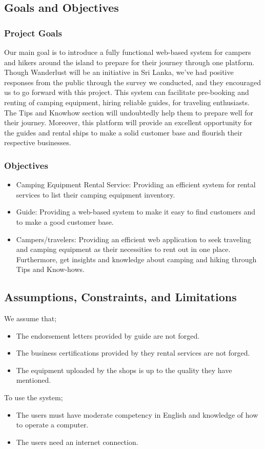 \subsection{Goals and Objectives}
\subsubsection{Project Goals}
Our main goal is to introduce a fully functional web-based system for campers and hikers around the island to prepare for their journey through one platform. Though Wanderlust will be an initiative in Sri Lanka, we’ve had positive responses from the public through the survey we conducted, and they encouraged us to go forward with this project. This system can facilitate pre-booking and renting of camping equipment, hiring reliable guides, for traveling enthusiasts. The Tips and Knowhow section will undoubtedly help them to prepare well for their journey. Moreover, this platform will provide an excellent opportunity for the guides and rental ships to make a solid customer base and flourish their respective businesses.

\subsubsection{Objectives}
\begin{itemize}
	\item Camping Equipment Rental Service: Providing an efficient system for rental services to list their camping equipment inventory.
      
	\item Guide: Providing a web-based system to make it easy to find customers and to make a good customer base.
	\item Campers/travelers: Providing an efficient web application to seek traveling and camping equipment as their necessities to rent out in one place. Furthermore, get insights and knowledge about camping and hiking through Tips and Know-hows.	
\end{itemize}



\subsection{Assumptions, Constraints, and Limitations}
We assume that; 
\begin{itemize}
 \item The endorsement letters provided by guide are not forged.
 \item The business certifications provided by they rental services are not forged.
 \item The equipment uploaded by the shops is up to the quality they have mentioned.
\end{itemize}
To use the system;
\begin{itemize}
    \item The users must have moderate competency in English and knowledge of how to operate a computer.
    \item The users need an internet connection.
\end{itemize}